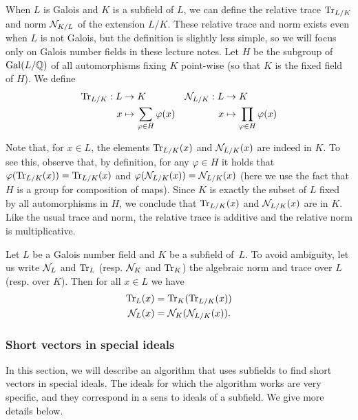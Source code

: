 When $L$ is Galois and $K$ is a subfield of $L$, we can define the relative trace $\mathrm{Tr}_{L/K}$ and norm $\mathcal{N}_{K/L}$ of the extension $L/K$. These relative trace and norm exists even when $L$ is not Galois, but the definition is slightly less simple, so we will focus only on Galois number fields in these lecture notes. Let $H$ be the subgroup of $\operatorname{Gal}(L/\mathbb{Q})$ of all automorphisms fixing $K$ point-wise (so that $K$ is the fixed field of $H$). We define
\begin{align*}
\mathrm{Tr}_{L/K}: L &\rightarrow K  & \mathcal{N}_{L/K}: L &\rightarrow K\\
x &\mapsto \sum_{\varphi \in H} \varphi(x)  & x &\mapsto \prod_{\varphi \in H} \varphi(x)\\
\end{align*}

Note that, for $x \in L$, the elements $\mathrm{Tr}_{L/K}(x)$ and $\mathcal{N}_{L/K}(x)$ are indeed in $K$. To see this, observe that, by definition, for any $\varphi \in H$ it holds that $\varphi(\mathrm{Tr}_{L/K}(x)) = \mathrm{Tr}_{L/K}(x)$ and $\varphi(\mathcal{N}_{L/K}(x)) = \mathcal{N}_{L/K}(x)$ (here we use the fact that $H$ is a group for composition of maps). Since $K$ is exactly the subset of $L$ fixed by all automorphisms in $H$, we conclude that $\mathrm{Tr}_{L/K}(x)$ and $\mathcal{N}_{L/K}(x)$ are in $K$. Like the usual trace and norm, the relative trace is additive and the relative norm is multiplicative.

\begin{lemma}
Let $L$ be a Galois number field and $K$ be a subfield of~$L$. To avoid ambiguity, let us write $\mathcal{N}_L$ and $\mathrm{Tr}_L$ (resp. $\mathcal{N}_K$ and $\mathrm{Tr}_K$) the algebraic norm and trace over $L$ (resp. over $K$). Then for all $x \in L$ we have
\begin{align}
\label{eq:composing-relative-norm} \mathrm{Tr}_L(x) &= \mathrm{Tr}_K(\mathrm{Tr}_{L/K}(x)) \\
\mathcal{N}_L(x) &= \mathcal{N}_K(\mathcal{N}_{L/K}(x)).
\end{align}
\end{lemma}

\subsubsection{Short vectors in special ideals}
\label{sec:attack-ideal-SVP}

In this section, we will describe an algorithm that uses subfields to find short vectors in special ideals. The ideals for which the algorithm works are very specific, and they correspond in a sens to ideals of a subfield. We give more details below.

